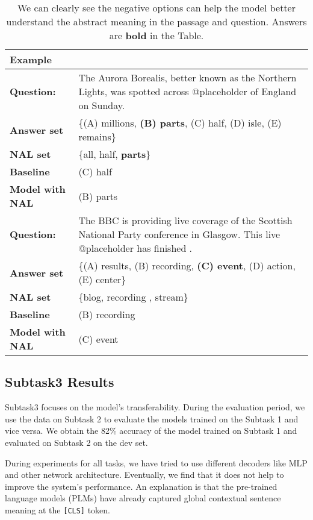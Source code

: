 \documentclass[11pt,a4paper]{article}
\begin{document}
\begin{table*}[!thbp]
\centering
\begin{tabularx}{1\textwidth}{p{3cm}  X}
\toprule[1pt]
\textbf{Example} & 
\\
\hline
\textbf{Question:} & The Aurora Borealis, better known as the Northern Lights, was spotted across @placeholder of England on Sunday.
\\
\textbf{Answer set} & \{(A) millions, \textbf{(B) parts}, (C) half, (D) isle, (E) remains\}  \\
\textbf{NAL set} & \{all, half, \textbf{parts}\} \\
\textbf{Baseline} & (C) half \\
\textbf{Model with NAL} &  (B) parts \\
\hline
\textbf{Question:} & The BBC is providing live coverage of the Scottish National Party conference in Glasgow. This live @placeholder has finished .
\\
\textbf{Answer set} & \{(A) results, (B) recording, \textbf{(C) event}, (D) action, (E) center\}  \\
\textbf{NAL set} & \{blog, recording , stream\} \\
\textbf{Baseline} & (B) recording \\
\textbf{Model with NAL} &  (C) event \\
\toprule[1pt]
\end{tabularx} 
\caption{\label{font-table} We can clearly see the negative options can help the model better understand the abstract meaning in the passage and question. Answers are \textbf{bold} in the Table. }
\label{tb:NAL-example}
\end{table*}

\subsection{Subtask3 Results}
Subtask3 focuses on the model's transferability. 
During the evaluation period, we use the data on Subtask 2 to evaluate the models trained on the Subtask 1 and vice versa.
We obtain the 82\% accuracy of the model trained on Subtask 1 and evaluated on Subtask 2 on the dev set.

During experiments for all tasks, we have tried to use different decoders like MLP and other network architecture. Eventually, we find that it does not help to improve the system's performance. 
An explanation is that the pre-trained language models (PLMs) have already captured global contextual sentence meaning at the \texttt{[CLS]} token. 
\end{document}
